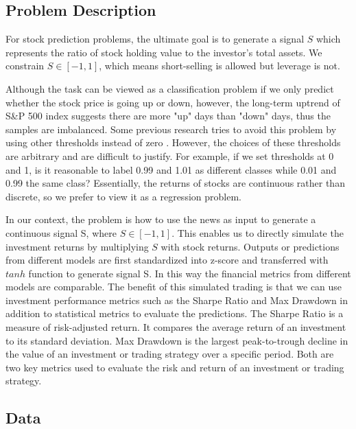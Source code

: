 \documentclass[11pt]{article}
\begin{document}
\subsection{Problem Description}

For stock prediction problems, the ultimate goal is to generate a signal $S$ which represents the ratio of stock holding value to the investor's total assets. We constrain $S \in [-1,1]$, which means short-selling is allowed but leverage is not.

Although the task can be viewed as a classification problem if we only predict whether the stock price is going up or down, however, the long-term uptrend of S\&P 500 index suggests there are more "up" days than "down" days, thus the samples are imbalanced. Some previous research tries to avoid this problem by using other thresholds instead of zero \citep{xu-cohen-2018-stock}. However, the choices of these thresholds are arbitrary and are difficult to justify. For example, if we set thresholds at 0 and 1, is it reasonable to label 0.99 and 1.01 as different classes while 0.01 and 0.99 the same class? Essentially, the returns of stocks are continuous rather than discrete, so we prefer to view it as a regression problem.

In our context, the problem is how to use the news as input to generate a continuous signal S, where $S \in [-1,1]$. This enables us to directly simulate the investment returns by multiplying $S$ with stock returns. Outputs or predictions from different models are first standardized into z-score and transferred with $tanh$ function to generate signal S. In this way the financial metrics from different models are comparable. The benefit of this simulated trading is that we can use investment performance metrics such as the Sharpe Ratio and Max Drawdown in addition to statistical metrics to evaluate the predictions. The Sharpe Ratio is a measure of risk-adjusted return. It compares the average return of an investment to its standard deviation. Max Drawdown is the largest peak-to-trough decline in the value of an investment or trading strategy over a specific period. Both are two key metrics used to evaluate the risk and return of an investment or trading strategy. 


\subsection{Data}
\end{document}
